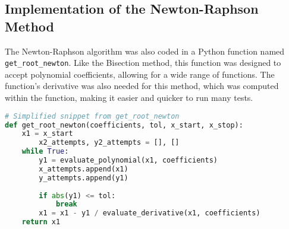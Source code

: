 \documentclass{llncs}
\numberwithin{figure}{section}
\begin{document}
\subsection{Implementation of the Newton-Raphson Method}
The Newton-Raphson algorithm was also coded in a Python function named \texttt{get\_root\_newton}. Like the Bisection method, this function was designed to accept polynomial coefficients, allowing for a wide range of functions. The function’s derivative was also needed for this method, which was computed within the function, making it easier and quicker to run many tests.
\vspace{1em}
\begin{lstlisting}[language=Python]
# Simplified snippet from get_root_newton
def get_root_newton(coefficients, tol, x_start, x_stop):
    x1 = x_start
		x2_attempts, y2_attempts = [], []
    while True:
        y1 = evaluate_polynomial(x1, coefficients)
        x_attempts.append(x1)
        y_attempts.append(y1)
        
        if abs(y1) <= tol:
            break
        x1 = x1 - y1 / evaluate_derivative(x1, coefficients)
    return x1
\end{lstlisting}
\newpage
\end{document}

